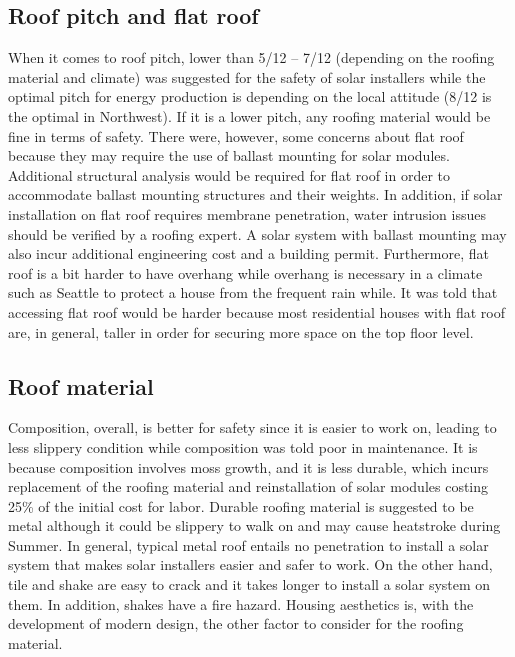 \documentclass[]{article}
\begin{document}
\hypertarget{roof-pitch-and-flat-roof}{%
\subsection{Roof pitch and flat roof}\label{roof-pitch-and-flat-roof}}

When it comes to roof pitch, lower than 5/12 -- 7/12 (depending on the
roofing material and climate) was suggested for the safety of solar
installers while the optimal pitch for energy production is depending on
the local attitude (8/12 is the optimal in Northwest). If it is a lower
pitch, any roofing material would be fine in terms of safety. There
were, however, some concerns about flat roof because they may require
the use of ballast mounting for solar modules. Additional structural
analysis would be required for flat roof in order to accommodate ballast
mounting structures and their weights. In addition, if solar
installation on flat roof requires membrane penetration, water intrusion
issues should be verified by a roofing expert. A solar system with
ballast mounting may also incur additional engineering cost and a
building permit. Furthermore, flat roof is a bit harder to have overhang
while overhang is necessary in a climate such as Seattle to protect a
house from the frequent rain while. It was told that accessing flat roof
would be harder because most residential houses with flat roof are, in
general, taller in order for securing more space on the top floor level.

\hypertarget{roof-material}{%
\subsection{Roof material}\label{roof-material}}

Composition, overall, is better for safety since it is easier to work
on, leading to less slippery condition while composition was told poor
in maintenance. It is because composition involves moss growth, and it
is less durable, which incurs replacement of the roofing material and
reinstallation of solar modules costing 25\% of the initial cost for
labor. Durable roofing material is suggested to be metal although it
could be slippery to walk on and may cause heatstroke during Summer. In
general, typical metal roof entails no penetration to install a solar
system that makes solar installers easier and safer to work. On the
other hand, tile and shake are easy to crack and it takes longer to
install a solar system on them. In addition, shakes have a fire hazard.
Housing aesthetics is, with the development of modern design, the other
factor to consider for the roofing material.
\end{document}
